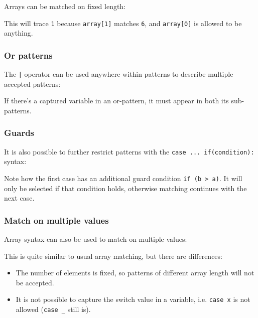 \documentclass{article}
\newcommand{\expr}[1]{\texttt{#1}}
\begin{document}
Arrays can be matched on fixed length:



This will trace \expr{1} because \expr{array[1]} matches \expr{6}, and \expr{array[0]} is allowed to be anything.

\subsubsection{Or patterns}

The \expr{|} operator can be used anywhere within patterns to describe multiple accepted patterns:



If there's a captured variable in an or-pattern, it must appear in both its sub-patterns.

\subsubsection{Guards}
\label{Guards}

It is also possible to further restrict patterns with the \expr{case ... if(condition):} syntax:



Note how the first case has an additional guard condition \expr{if (b > a)}. It will only be selected if that condition holds, otherwise matching continues with the next case.

\subsubsection{Match on multiple values}

Array syntax can also be used to match on multiple values:



This is quite similar to usual array matching, but there are differences:

\begin{itemize}
	\item The number of elements is fixed, so patterns of different array length will not be accepted.
	\item It is not possible to capture the switch value in a variable, i.e. \expr{case x} is not allowed (\expr{case _} still is).
\end{itemize}
\end{document}
